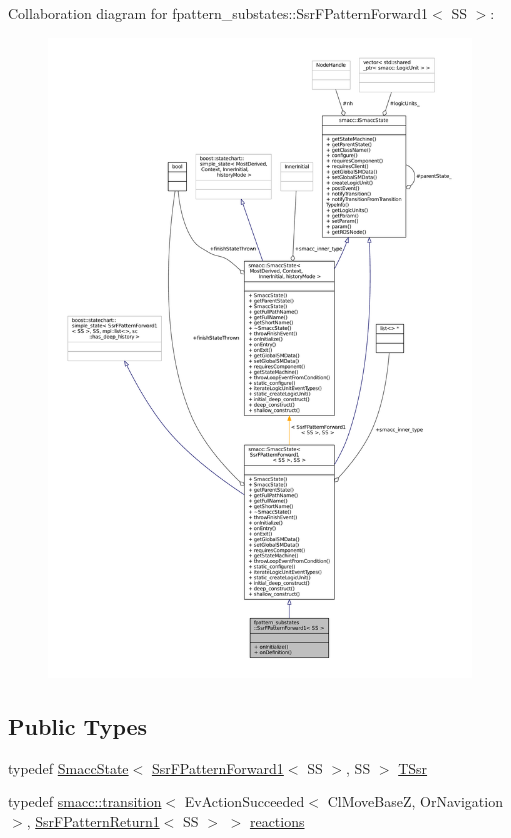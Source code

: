 Collaboration diagram for fpattern\+\_\+substates\+:\+:Ssr\+F\+Pattern\+Forward1$<$ SS $>$\+:
\nopagebreak
\begin{figure}[H]
\begin{center}
\leavevmode
\includegraphics[width=350pt]{structfpattern__substates_1_1SsrFPatternForward1__coll__graph}
\end{center}
\end{figure}
\subsection*{Public Types}
\begin{DoxyCompactItemize}
\item 
typedef \hyperlink{classSmaccState}{Smacc\+State}$<$ \hyperlink{structfpattern__substates_1_1SsrFPatternForward1}{Ssr\+F\+Pattern\+Forward1}$<$ SS $>$, SS $>$ \hyperlink{structfpattern__substates_1_1SsrFPatternForward1_a155b8837b3dde89979e913435997f704}{T\+Ssr}
\item 
typedef \hyperlink{classsmacc_1_1transition}{smacc\+::transition}$<$ Ev\+Action\+Succeeded$<$ Cl\+Move\+BaseZ, Or\+Navigation $>$, \hyperlink{structfpattern__substates_1_1SsrFPatternReturn1}{Ssr\+F\+Pattern\+Return1}$<$ SS $>$ $>$ \hyperlink{structfpattern__substates_1_1SsrFPatternForward1_a2fb7fbee29ff3305db7e77d87449fb9e}{reactions}
\end{DoxyCompactItemize}
